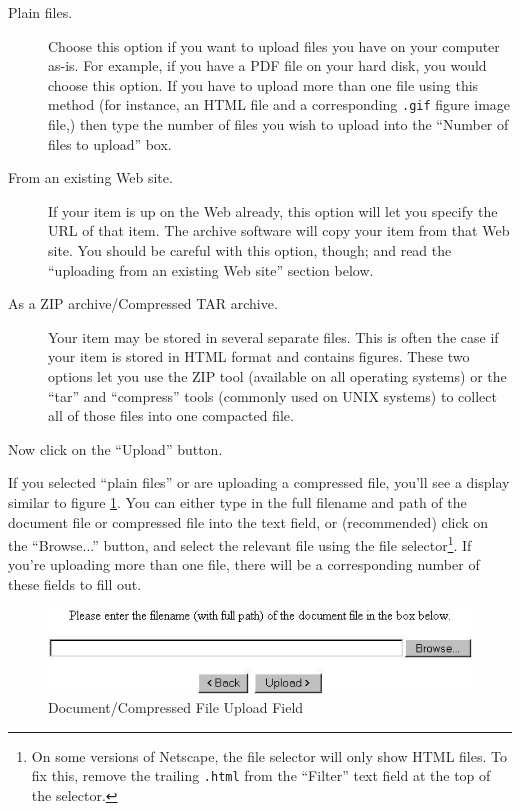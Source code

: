 \begin{description}
\item[Plain files.] Choose this option if you want to upload files you have on your computer as-is. For example, if you have a PDF file on your hard disk, you would choose this option. If you have to upload more than one file using this method (for instance, an HTML file and a corresponding {\tt .gif} figure image file,) then type the number of files you wish to upload into the ``Number of files to upload'' box.
\item[From an existing Web site.] If your item is up on the Web already, this option will let you specify the URL of that item. The archive software will copy your item from that Web site. You should be careful with this option, though; and read the ``uploading from an existing Web site'' section below.
\item[As a ZIP archive/Compressed TAR archive.] Your item may be stored in several separate files. This is often the case if your item is stored in HTML format and contains figures. These two options let you use the ZIP tool (available on all operating systems) or the ``tar'' and ``compress'' tools (commonly used on UNIX systems) to collect all of those files into one compacted file.
\end{description}

Now click on the ``Upload'' button.

If you selected ``plain files'' or are uploading a compressed file, you'll see a display similar to figure \ref{plain_files}. You can either type in the full filename and path of the document file or compressed file into the text field, or (recommended) click on the ``Browse...'' button, and select the relevant file using the file selector\footnote{On some versions of Netscape, the file selector will only show HTML files. To fix this, remove the trailing {\tt .html} from the ``Filter'' text field at the top of the selector.}. If you're uploading more than one file, there will be a corresponding number of these fields to fill out.

\begin{figure}
\centerline{\includegraphics[width=4.5in]{images/plain-files}}
\caption{\label{plain_files} Document/Compressed File Upload Field}
\end{figure}

